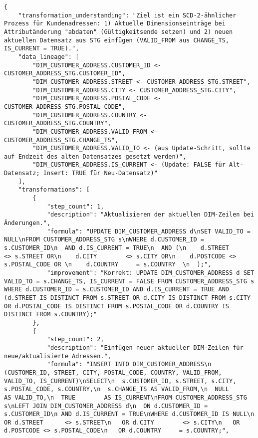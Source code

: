 \begin{lstlisting}[caption={Ausgabe: GPT-5 Anwendungsfall 9 Konsistenzdurchlauf},label={gpt_case9_prompt2}]
{
    "transformation_understanding": "Ziel ist ein SCD-2-ähnlicher Prozess für Kundenadressen: 1) Aktuelle Dimensionseinträge bei Attributänderung "abdaten" (Gültigkeitsende setzen) und 2) neuen aktuellen Datensatz aus STG einfügen (VALID_FROM aus CHANGE_TS, IS_CURRENT = TRUE).",
    "data_lineage": [
        "DIM_CUSTOMER_ADDRESS.CUSTOMER_ID <- CUSTOMER_ADDRESS_STG.CUSTOMER_ID",
        "DIM_CUSTOMER_ADDRESS.STREET <- CUSTOMER_ADDRESS_STG.STREET",
        "DIM_CUSTOMER_ADDRESS.CITY <- CUSTOMER_ADDRESS_STG.CITY",
        "DIM_CUSTOMER_ADDRESS.POSTAL_CODE <- CUSTOMER_ADDRESS_STG.POSTAL_CODE",
        "DIM_CUSTOMER_ADDRESS.COUNTRY <- CUSTOMER_ADDRESS_STG.COUNTRY",
        "DIM_CUSTOMER_ADDRESS.VALID_FROM <- CUSTOMER_ADDRESS_STG.CHANGE_TS",
        "DIM_CUSTOMER_ADDRESS.VALID_TO <- (aus Update-Schritt, sollte auf Endzeit des alten Datensatzes gesetzt werden)",
        "DIM_CUSTOMER_ADDRESS.IS_CURRENT <- (Update: FALSE für Alt-Datensatz; Insert: TRUE für Neu-Datensatz)"
    ],
    "transformations": [
        {
            "step_count": 1,
            "description": "Aktualisieren der aktuellen DIM-Zeilen bei Änderungen.",
            "formula": "UPDATE DIM_CUSTOMER_ADDRESS d\nSET VALID_TO = NULL\nFROM CUSTOMER_ADDRESS_STG s\nWHERE d.CUSTOMER_ID = s.CUSTOMER_ID\n  AND d.IS_CURRENT = TRUE\n  AND (\n    d.STREET      <> s.STREET OR\n    d.CITY        <> s.CITY OR\n    d.POSTCODE <> s.POSTAL_CODE OR \n    d.COUNTRY     = s.COUNTRY  \n  );",
            "improvement": "Korrekt: UPDATE DIM_CUSTOMER_ADDRESS d SET VALID_TO = s.CHANGE_TS, IS_CURRENT = FALSE FROM CUSTOMER_ADDRESS_STG s WHERE d.CUSTOMER_ID = s.CUSTOMER_ID AND d.IS_CURRENT = TRUE AND (d.STREET IS DISTINCT FROM s.STREET OR d.CITY IS DISTINCT FROM s.CITY OR d.POSTAL_CODE IS DISTINCT FROM s.POSTAL_CODE OR d.COUNTRY IS DISTINCT FROM s.COUNTRY);"
        },
        {
            "step_count": 2,
            "description": "Einfügen neuer aktueller DIM-Zeilen für neue/aktualisierte Adressen.",
            "formula": "INSERT INTO DIM_CUSTOMER_ADDRESS\n  (CUSTOMER_ID, STREET, CITY, POSTAL_CODE, COUNTRY, VALID_FROM, VALID_TO, IS_CURRENT)\nSELECT\n  s.CUSTOMER_ID, s.STREET, s.CITY, s.POSTAL_CODE, s.COUNTRY,\n  s.CHANGE_TS AS VALID_FROM,\n  NULL        AS VALID_TO,\n  TRUE        AS IS_CURRENT\nFROM CUSTOMER_ADDRESS_STG s\nLEFT JOIN DIM_CUSTOMER_ADDRESS d\n  ON d.CUSTOMER_ID = s.CUSTOMER_ID\n AND d.IS_CURRENT = TRUE\nWHERE d.CUSTOMER_ID IS NULL\n   OR d.STREET      <> s.STREET\n   OR d.CITY        <> s.CITY\n   OR d.POSTCODE <> s.POSTAL_CODE\n   OR d.COUNTRY     = s.COUNTRY;",

\end{lstlisting}
